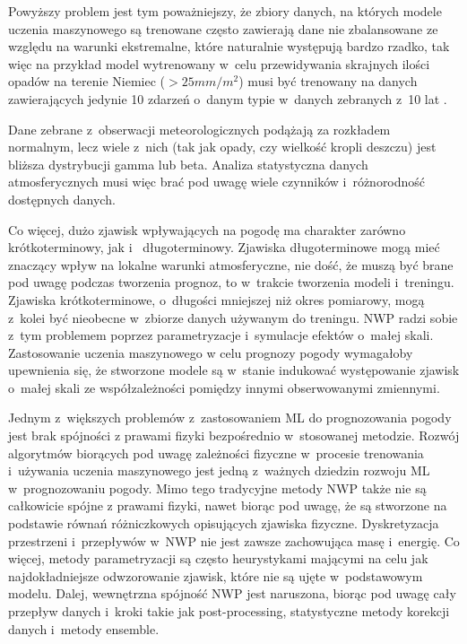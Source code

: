 Powyższy problem jest tym poważniejszy, że zbiory danych, na których modele uczenia maszynowego
są trenowane często zawierają dane nie zbalansowane ze względu na warunki ekstremalne, które naturalnie
występują bardzo rzadko, tak więc na przykład model wytrenowany w~celu przewidywania
skrajnych ilości opadów na terenie Niemiec ($> 25mm/m^2$) musi być trenowany na danych 
zawierających jedynie 10 zdarzeń o~danym typie w~danych zebranych z~10 lat \cite{can-dl-beat-numerical}.

Dane zebrane z~obserwacji meteorologicznych podążają za
rozkładem normalnym, lecz wiele z~nich (tak jak opady, czy wielkość kropli deszczu) 
\cite{can-dl-beat-numerical} jest bliższa dystrybucji gamma lub beta. Analiza statystyczna
danych atmosferycznych musi więc brać pod uwagę wiele czynników i~różnorodność dostępnych danych.

Co więcej, dużo zjawisk wpływających na pogodę ma charakter zarówno krótkoterminowy, jak i~
długoterminowy. Zjawiska długoterminowe mogą mieć znaczący wpływ na lokalne warunki atmosferyczne,
nie dość, że muszą być brane pod uwagę podczas tworzenia prognoz, to w~trakcie tworzenia modeli
i~treningu. Zjawiska krótkoterminowe, o~długości mniejszej niż okres pomiarowy, mogą z~kolei
być nieobecne w~zbiorze danych używanym do treningu. NWP radzi sobie z~tym problemem poprzez 
parametryzacje i~symulacje efektów o~małej skali. Zastosowanie uczenia maszynowego
w celu prognozy pogody wymagałoby upewnienia się, że stworzone modele są w~stanie 
indukować występowanie zjawisk o~małej skali ze współzależności pomiędzy innymi obserwowanymi 
zmiennymi.

Jednym z~większych problemów z~zastosowaniem ML do prognozowania pogody jest brak spójności
z prawami fizyki bezpośrednio w~stosowanej metodzie. Rozwój algorytmów biorących pod uwagę
zależności fizyczne w~procesie trenowania i~używania uczenia maszynowego jest jedną z~ważnych dziedzin
rozwoju ML w~prognozowaniu pogody. Mimo tego tradycyjne metody NWP także nie są całkowicie spójne
z prawami fizyki, nawet biorąc pod uwagę, że są stworzone na podstawie równań różniczkowych
opisujących zjawiska fizyczne. Dyskretyzacja przestrzeni i~przepływów w~NWP nie jest zawsze 
zachowująca masę i~energię. Co więcej, metody parametryzacji są często heurystykami 
mającymi na celu jak najdokładniejsze odwzorowanie zjawisk, które nie są ujęte w~podstawowym modelu.
Dalej, wewnętrzna spójność NWP jest naruszona, biorąc pod uwagę cały przepływ
danych i~kroki takie jak post-processing, statystyczne metody korekcji danych i~metody 
ensemble.

